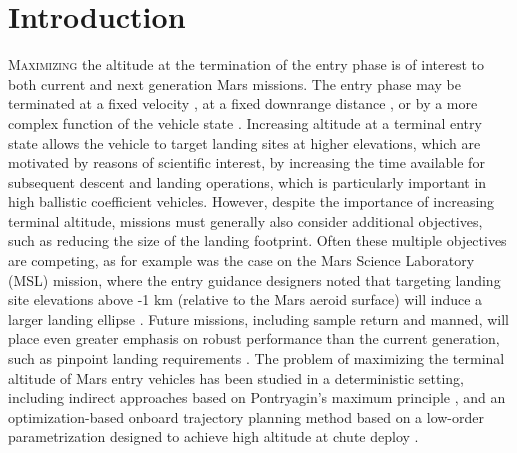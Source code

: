 \documentclass[journal ]{new-aiaa}
\begin{document}
\section*{Introduction}


\lettrine{M}{aximizing} the altitude at the termination of the entry phase is of interest to both current and next generation Mars missions. The entry phase may be terminated at a fixed velocity \cite{MSL_EDL2}, at a fixed downrange distance \cite{TriggerComparison2020}, or by a more complex function of the vehicle state \cite{LuAdaptiveEDL}. Increasing altitude at a terminal entry state allows the vehicle to target landing sites at higher elevations, which are motivated by reasons of scientific interest, by increasing the time available for subsequent descent and landing operations, which is particularly important in high ballistic coefficient vehicles. However, despite the importance of increasing terminal altitude, missions must generally also consider additional objectives, such as reducing the size of the landing footprint. Often these multiple objectives are competing, as for example was the case on the Mars Science Laboratory (MSL) mission, where the entry guidance designers noted that targeting landing site elevations above -1 km (relative to the Mars aeroid surface) will induce a larger landing ellipse \cite{MSL_EDL2}. 
Future missions, including sample return \cite{MSR} and manned, will place even greater emphasis on robust performance than the current generation, such as pinpoint landing requirements \cite{EvolvableMars}. 
The problem of maximizing the terminal altitude of Mars entry vehicles has been studied in a deterministic setting, including indirect approaches based on Pontryagin's maximum principle
\cite{AltitudeOptimization,AltitudeOptimizationIndirect}, and an optimization-based onboard trajectory planning method based on a low-order parametrization designed to achieve high altitude at chute deploy
\cite{GuangfeiDissertation}. 
\end{document}
